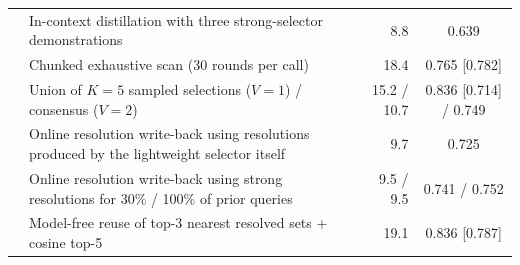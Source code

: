 \documentclass[10pt]{article}
\begin{document}
\begin{table}[t]
{\begin{tabular}{llrc}
 & In-context distillation with three strong-selector demonstrations & 8.8 & 0.639 \\
 & Chunked exhaustive scan (30 rounds per call) & 18.4 & 0.765 [0.782] \\
\midrule
{}
 & Union of $K{=}5$ sampled selections ($V{=}1$) / consensus ($V{=}2$) & 15.2 / 10.7 & 0.836 [0.714] / 0.749 \\
 & Online resolution write-back using resolutions produced by the lightweight selector itself & 9.7 & 0.725 \\
 & Online resolution write-back using strong resolutions for 30\% / 100\% of prior queries & 9.5 / 9.5 & 0.741 / 0.752 \\
 & Model-free reuse of top-3 nearest resolved sets + cosine top-5 & 19.1 & 0.836 [0.787] \\
\bottomrule
\end{tabular}}
\end{table}
\end{document}
